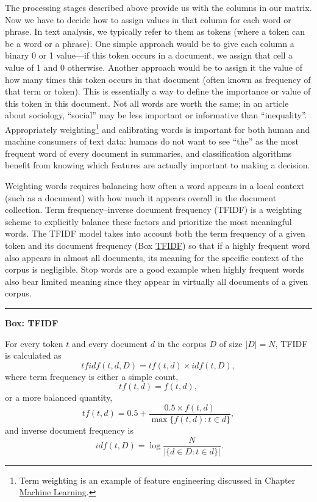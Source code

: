 \documentclass[]{krantz}
\begin{document}
The processing stages described above provide us with the columns in our
matrix. Now we have to decide how to assign values in that column for
each word or phrase. In text analysis, we typically refer to them as
tokens (where a token can be a word or a phrase). One simple approach
would be to give each column a binary 0 or 1 value---if this token
occurs in a document, we assign that cell a value of 1 and 0 otherwise.
Another approach would be to assign it the value of how many times this
token occurs in that document (often known as frequency of that term or
token). This is essentially a way to define the importance or value of
this token in this document. Not all words are worth the same; in an
article about sociology, ``social'' may be less important or informative
than ``inequality''. Appropriately weighting\footnote{Term weighting is
  an example of feature engineering discussed in Chapter
  \protect\hyperlink{chap:ml}{Machine Learning}.} and calibrating words
is important for both human and machine consumers of text data: humans
do not want to see ``the'' as the most frequent word of every document
in summaries, and classification algorithms benefit from knowing which
features are actually important to making a decision.

Weighting words requires balancing how often a word appears in a local
context (such as a document) with how much it appears overall in the
document collection. Term frequency--inverse document frequency (TFIDF)
\citep{salton-68} is a weighting scheme to explicitly balance these
factors and prioritize the most meaningful words. The TFIDF model takes
into account both the term frequency of a given token and its document
frequency (Box \protect\hyperlink{box:text1}{TFIDF}) so that if a highly
frequent word also appears in almost all documents, its meaning for the
specific context of the corpus is negligible. Stop words are a good
example when highly frequent words also bear limited meaning since they
appear in virtually all documents of a given corpus.

\begin{center}\rule{0.5\linewidth}{\linethickness}\end{center}

\textbf{Box: TFIDF}

For every token \(t\) and every document \(d\) in the corpus \(D\) of
size \(\mid D\mid = N\), TFIDF is calculated as
\[tfidf(t,d,D) = tf(t,d) \times
idf(t,D),\] where term frequency is either a simple count,
\[tf(t,d)=f(t,d),\] or a more balanced quantity,
\[tf(t,d) = 0.5+\frac{0.5 \times
  f(t,d)}{\max\{f(t,d):t\in d\}},\] and inverse document frequency is
\[\
idf(t,D) = \log\frac{N}{|\{d\in D:t\in d\}|}.\]
\end{document}
